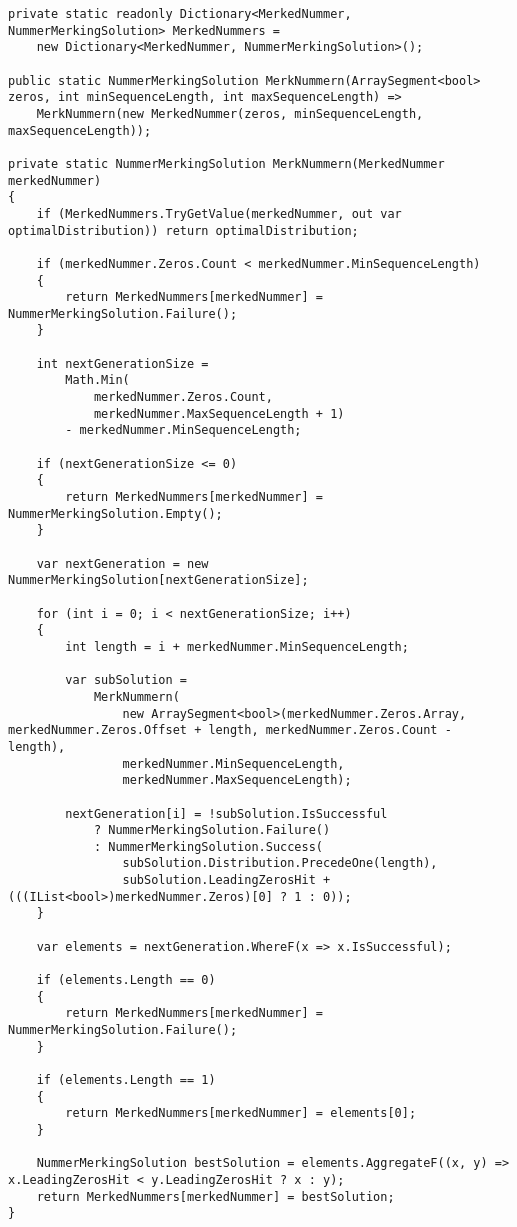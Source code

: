 \documentclass[12pt]{article}
\begin{document}
\begin{lstlisting}
private static readonly Dictionary<MerkedNummer, NummerMerkingSolution> MerkedNummers =
    new Dictionary<MerkedNummer, NummerMerkingSolution>();

public static NummerMerkingSolution MerkNummern(ArraySegment<bool> zeros, int minSequenceLength, int maxSequenceLength) =>
    MerkNummern(new MerkedNummer(zeros, minSequenceLength, maxSequenceLength));

private static NummerMerkingSolution MerkNummern(MerkedNummer merkedNummer)
{
    if (MerkedNummers.TryGetValue(merkedNummer, out var optimalDistribution)) return optimalDistribution;

    if (merkedNummer.Zeros.Count < merkedNummer.MinSequenceLength)
    {
        return MerkedNummers[merkedNummer] = NummerMerkingSolution.Failure();
    }

    int nextGenerationSize =
        Math.Min(
            merkedNummer.Zeros.Count,
            merkedNummer.MaxSequenceLength + 1)
        - merkedNummer.MinSequenceLength;

    if (nextGenerationSize <= 0)
    {
        return MerkedNummers[merkedNummer] = NummerMerkingSolution.Empty();
    }

    var nextGeneration = new NummerMerkingSolution[nextGenerationSize];

    for (int i = 0; i < nextGenerationSize; i++)
    {
        int length = i + merkedNummer.MinSequenceLength;

        var subSolution =
            MerkNummern(
                new ArraySegment<bool>(merkedNummer.Zeros.Array, merkedNummer.Zeros.Offset + length, merkedNummer.Zeros.Count - length),
                merkedNummer.MinSequenceLength,
                merkedNummer.MaxSequenceLength);

        nextGeneration[i] = !subSolution.IsSuccessful
            ? NummerMerkingSolution.Failure()
            : NummerMerkingSolution.Success(
                subSolution.Distribution.PrecedeOne(length),
                subSolution.LeadingZerosHit + (((IList<bool>)merkedNummer.Zeros)[0] ? 1 : 0));
    }

    var elements = nextGeneration.WhereF(x => x.IsSuccessful);

    if (elements.Length == 0)
    {
        return MerkedNummers[merkedNummer] = NummerMerkingSolution.Failure();
    }

    if (elements.Length == 1)
    {
        return MerkedNummers[merkedNummer] = elements[0];
    }

    NummerMerkingSolution bestSolution = elements.AggregateF((x, y) => x.LeadingZerosHit < y.LeadingZerosHit ? x : y);
    return MerkedNummers[merkedNummer] = bestSolution;
}
\end{lstlisting}
\end{document}
